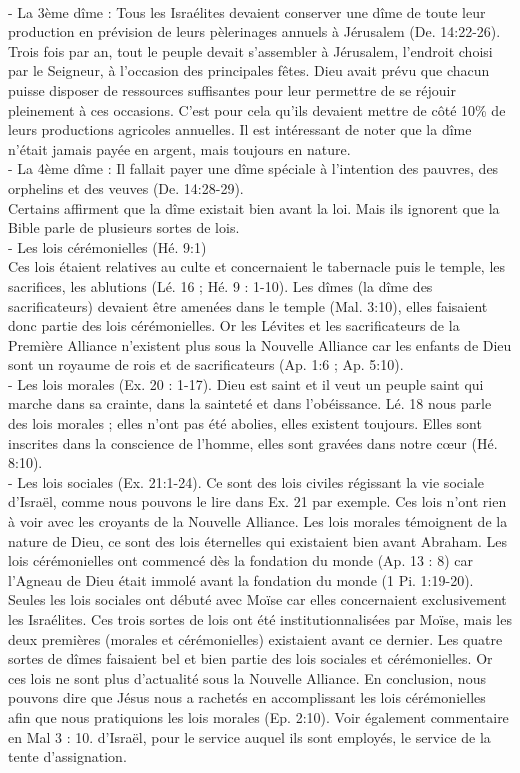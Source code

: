 \begin{multicols}{2}
{\\- La 3ème dîme : Tous les Israélites devaient conserver une dîme de toute leur production en prévision de leurs pèlerinages annuels à Jérusalem (De. 14:22-26).
\\Trois fois par an, tout le peuple devait s'assembler à Jérusalem, l'endroit choisi par le Seigneur, à l'occasion des principales fêtes. Dieu avait prévu que chacun puisse disposer de ressources suffisantes pour leur permettre de se réjouir pleinement à ces occasions. C'est pour cela qu'ils devaient mettre de côté 10\% de leurs productions agricoles annuelles. Il est intéressant de noter que la dîme n'était jamais payée en argent, mais toujours en nature.
\\- La 4ème dîme : Il fallait payer une dîme spéciale à l'intention des pauvres, des orphelins et des veuves (De. 14:28-29). 
\\Certains affirment que la dîme existait bien avant la loi. Mais ils ignorent que la Bible parle de plusieurs sortes de lois.
\\- Les lois cérémonielles (Hé. 9:1)
\\Ces lois étaient relatives au culte et concernaient le tabernacle puis le temple, les sacrifices, les ablutions (Lé. 16 ; Hé. 9 : 1-10). Les dîmes (la dîme des sacrificateurs) devaient être amenées dans le temple (Mal. 3:10), elles faisaient donc partie des lois cérémonielles. Or les Lévites et les sacrificateurs de la Première Alliance n'existent plus sous la Nouvelle Alliance car les enfants de Dieu sont un royaume de rois et de sacrificateurs (Ap. 1:6 ; Ap. 5:10).
\\- Les lois morales (Ex. 20 : 1-17). Dieu est saint et il veut un peuple saint qui marche dans sa crainte, dans la sainteté et dans l'obéissance. Lé. 18 nous parle des lois morales ; elles n'ont pas été abolies, elles existent toujours. Elles sont inscrites dans la conscience de l'homme, elles sont gravées dans notre cœur (Hé. 8:10).
\\- Les lois sociales (Ex. 21:1-24). Ce sont des lois civiles régissant la vie sociale d'Israël, comme nous pouvons le lire dans Ex. 21 par exemple. Ces lois n'ont rien à voir avec les croyants de la Nouvelle Alliance. Les lois morales témoignent de la nature de Dieu, ce sont des lois éternelles qui existaient bien avant Abraham. Les lois cérémonielles ont commencé dès la fondation du monde (Ap. 13 : 8) car l'Agneau de Dieu était immolé avant la fondation du monde (1 Pi. 1:19-20). Seules les lois sociales ont débuté avec Moïse car elles concernaient exclusivement les Israélites. Ces trois sortes de lois ont été institutionnalisées par Moïse, mais les deux premières (morales et cérémonielles) existaient avant ce dernier. Les quatre sortes de dîmes faisaient bel et bien partie des lois sociales et cérémonielles. Or ces lois ne sont plus d'actualité sous la Nouvelle Alliance. En conclusion, nous pouvons dire que Jésus nous a rachetés en accomplissant les lois cérémonielles afin que nous pratiquions les lois morales (Ep. 2:10). Voir également commentaire en Mal 3 : 10.} d'Israël, pour le service auquel ils sont employés, le service de la tente d'assignation.

\end{multicols}
